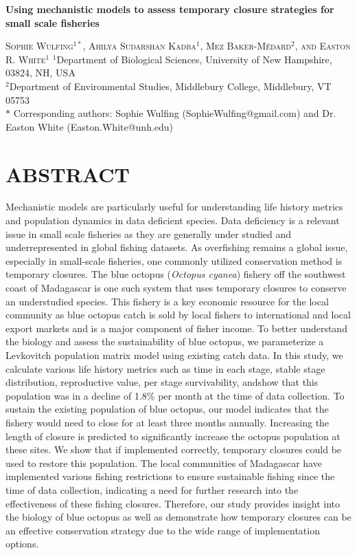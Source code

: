 \documentclass[
]{article}
\author{}
\date{\vspace{-2.5em}}
\begin{document}
\begin{center}
    
\textbf{\Large Using mechanistic models to assess temporary closure strategies for small scale fisheries}
    
\textsc{Sophie Wulfing$^{1*}$, Ahilya Sudarshan Kadba$^{1}$, Mez Baker-Médard$^{2}$, and Easton R. White$^{1}$}
\vspace{3 mm}
\normalsize{\indent $^1$Department of Biological Sciences, University of New Hampshire, 03824, NH, USA \\ $^2$Department of Environmental Studies, Middlebury College, Middlebury, VT 05753\\}
$\text{*}$ Corresponding authors: Sophie Wulfing (SophieWulfing@gmail.com) and Dr. Easton White (Easton.White@unh.edu)
\end{center}

\newpage

\linenumbers

\hypertarget{abstract}{%
\section{ABSTRACT}\label{abstract}}

Mechanistic models are particularly useful for understanding life history metrics and population dynamics in data deficient species. Data deficiency is a relevant issue in small scale fisheries as they are generally under studied and underrepresented in global fishing datasets. As overfishing remains a global issue, especially in small-scale fisheries, one commonly utilized conservation method is temporary closures. The blue octopus (\emph{Octopus cyanea}) fishery off the southwest coast of Madagascar is one such system that uses temporary closures to conserve an understudied species. This fishery is a key economic resource for the local community as blue octopus catch is sold by local fishers to international and local export markets and is a major component of fisher income. To better understand the biology and assess the sustainability of blue octopus, we parameterize a Levkovitch population matrix model using existing catch data. In this study, we calculate various life history metrics such as time in each stage, stable stage distribution, reproductive value, per stage survivability, andshow that this population was in a decline of 1.8\% per month at the time of data collection. To sustain the existing population of blue octopus, our model indicates that the fishery would need to close for at least three months annually. Increasing the length of closure is predicted to significantly increase the octopus population at these sites. We show that if implemented correctly, temporary closures could be used to restore this population. The local communities of Madagascar have implemented various fishing restrictions to ensure sustainable fishing since the time of data collection, indicating a need for further research into the effectiveness of these fishing closures. Therefore, our study provides insight into the biology of blue octopus as well as demonstrate how temporary closures can be an effective conservation strategy due to the wide range of implementation options.
\end{document}
